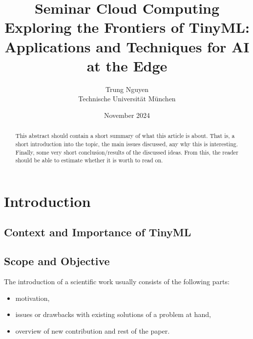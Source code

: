 \documentclass[A4,twocolumn]{article}
\author{Trung Nguyen\\ Technische Universit\"at M\"unchen}
\title{Seminar Cloud Computing \\
       {\bf Exploring the Frontiers of TinyML: Applications and Techniques for AI at the Edge}
}
\date{November 2024}
\begin{document}
\maketitle

\begin{abstract}

This abstract should contain a short summary of what this
article is about. That is, a short introduction into the
topic, the main issues discussed, any why this is interesting.
Finally, some very short conclusion/results of the discussed
ideas. From this, the reader should be able to estimate whether
it is worth to read on.
\end{abstract}

\section{Introduction}

\label{introduction}

\subsection{Context and Importance of TinyML}
\subsection{Scope and Objective}

The introduction of a scientific work usually consists of the following
parts:

\begin{itemize}
	\item motivation,
	\item issues or drawbacks with existing solutions of a problem at 
hand,
	\item overview of new contribution and rest of the paper.
\end{itemize}
\end{document}
